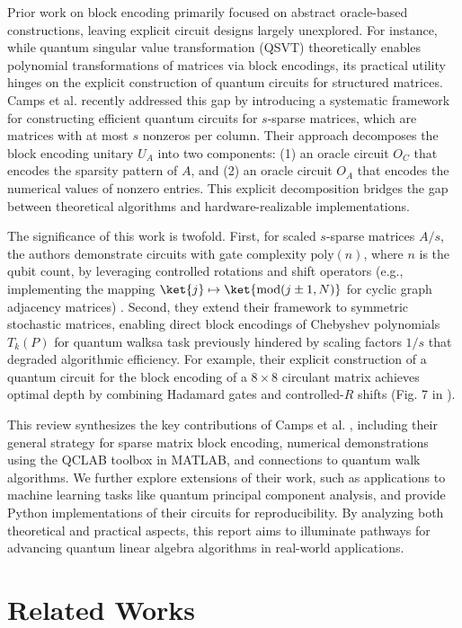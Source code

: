 \documentclass{article}
\begin{document}
Prior work on block encoding primarily focused on abstract oracle-based constructions, leaving explicit circuit designs largely unexplored. For instance, while quantum singular value transformation (QSVT) \cite{Gilyen2019} theoretically enables polynomial transformations of matrices via block encodings, its practical utility hinges on the explicit construction of quantum circuits for structured matrices. Camps et al. \cite{EQC} recently addressed this gap by introducing a systematic framework for constructing efficient quantum circuits for $s$-sparse matrices, which are matrices with at most $s$ nonzeros per column. Their approach decomposes the block encoding unitary $U_A$ into two components: (1) an oracle circuit $O_C$ that encodes the sparsity pattern of $A$, and (2) an oracle circuit $O_A$ that encodes the numerical values of nonzero entries. This explicit decomposition bridges the gap between theoretical algorithms and hardware-realizable implementations.

The significance of this work is twofold. First, for scaled $s$-sparse matrices $A/s$, the authors demonstrate circuits with gate complexity $\text{poly}(n)$, where $n$ is the qubit count, by leveraging controlled rotations and shift operators (e.g., implementing the mapping $\ket{j} \mapsto \ket{\text{mod}(j \pm 1, N)}$ for cyclic graph adjacency matrices) \cite{EQC}. Second, they extend their framework to symmetric stochastic matrices, enabling direct block encodings of Chebyshev polynomials $T_k(P)$ for quantum walks\textemdash a task previously hindered by scaling factors $1/s$ that degraded algorithmic efficiency. For example, their explicit construction of a quantum circuit for the block encoding of a $8 \times 8$ circulant matrix achieves optimal depth by combining Hadamard gates and controlled-$R$ shifts (Fig. 7 in \cite{EQC}).

This review synthesizes the key contributions of Camps et al. \cite{EQC}, including their general strategy for sparse matrix block encoding, numerical demonstrations using the QCLAB toolbox in MATLAB, and connections to quantum walk algorithms. We further explore extensions of their work, such as applications to machine learning tasks like quantum principal component analysis, and provide Python implementations of their circuits for reproducibility. By analyzing both theoretical and practical aspects, this report aims to illuminate pathways for advancing quantum linear algebra algorithms in real-world applications.

\section{Related Works}
\end{document}

